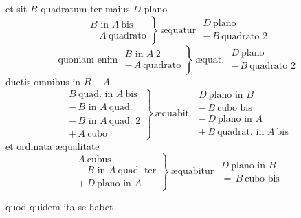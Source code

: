 \documentclass[11pt,a4paper]{article}
\begin{document}
et sit $B$ quadratum ter maius $D$ plano
\[ \left.\begin{array}{l} B \text{ in } A\ \text{bis} \\ -\,A\ \text{quadrato} \end{array}\right\}\ \text{æquatur } \begin{array}{l} D\ \text{plano} \\ -\,B\ \text{quadrato } 2 \end{array} \]
\[ \text{quoniam enim } \left.\begin{array}{l} B \text{ in } A\ 2 \\ -\,A\ \text{quadrato} \end{array}\right\}\ \text{æquat. } \begin{array}{l} D\ \text{plano} \\ -\,B\ \text{quadrato } 2 \end{array} \]
ductis omnibus in $B - A$
\[ \left.\begin{array}{l} B\ \text{quad. in } A\ \text{bis} \\ -\,B \text{ in } A\ \text{quad.} \\ -\,B \text{ in } A\ \text{quad. } 2 \\ +\,A\ \text{cubo} \end{array}\right\}\ \text{æquabit. } \begin{array}{l} D\ \text{plano in } B \\ -\,B\ \text{cubo bis} \\ -\,D\ \text{plano in } A \\ +\,B\ \text{quadrat. in } A\ \text{bis} \end{array} \]
et ordinata æqualitate
\[ \left.\begin{array}{l} A\ \text{cubus} \\ -\,B \text{ in } A\ \text{quad. ter} \\ +\,D\ \text{plano in } A \end{array}\right\}\ \text{æquabitur } \begin{array}{l} D\ \text{plano in } B \\ =\,B\ \text{cubo bis} \end{array} \]

quod quidem ita se habet
\end{document}
